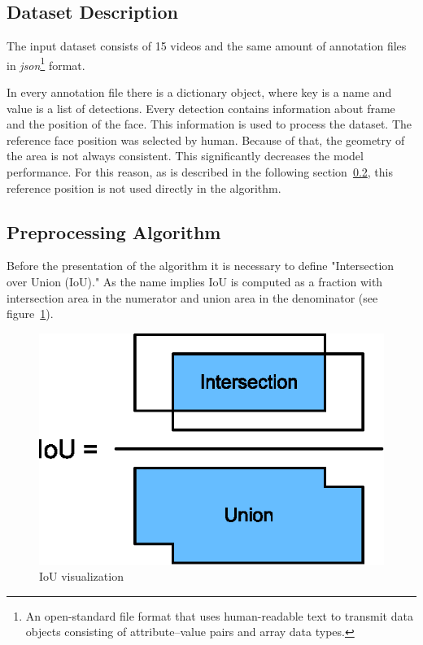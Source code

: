 \subsection{Dataset Description}\label{subsec:dataset-description}
The input dataset consists of 15 videos and the same amount of annotation files in \textit{json}\footnote{An
open-standard file format that uses human-readable text to transmit data objects consisting of attribute–value pairs
and array data types.} format.

In every annotation file there is a dictionary object, where key is a name and value is a list of detections.
Every detection contains information about frame and the position of the face.
This information is used to process the dataset.
The reference face position was selected by human.
Because of that, the geometry of the area is not always consistent.
This significantly decreases the model performance.
For this reason, as is described in the following section~\ref{subsec:preproalgo}, this reference position is not
used directly in the algorithm.

\subsection{Preprocessing Algorithm}\label{subsec:preproalgo}
Before the presentation of the algorithm it is necessary to define "Intersection over Union (IoU)."
As the name implies IoU is computed as a fraction with intersection area in the numerator and union area in the
denominator (see figure~\ref{fig:iou}).

\begin{figure}[H]
    \centering
    \includegraphics{images/implementation/iou.eps}
    \caption{IoU visualization\cite{IoU}}
    \label{fig:iou}
\end{figure}

